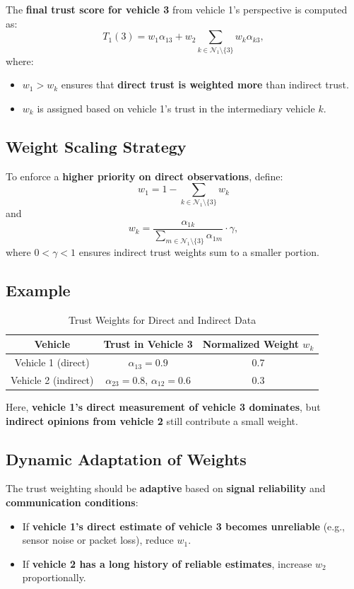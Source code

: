 \documentclass[letterpaper, 10pt, conference]{ieeeconf}  %
\begin{document}
The \textbf{final trust score for vehicle 3} from vehicle 1’s perspective is computed as:
\[
T_{1}(3) = w_1 \alpha_{13} + w_2 \sum_{k \in \mathcal{N}_1 \setminus \{3\}} w_k \alpha_{k3},
\]
where:
\begin{itemize}
    \item \( w_1 > w_k \) ensures that \textbf{direct trust is weighted more} than indirect trust.
    \item \( w_k \) is assigned based on vehicle 1’s trust in the intermediary vehicle \( k \).
\end{itemize}

\subsection{Weight Scaling Strategy}
To enforce a \textbf{higher priority on direct observations}, define:
\[
w_1 = 1 - \sum_{k \in \mathcal{N}_1 \setminus \{3\}} w_k
\]
and
\[
w_k = \frac{\alpha_{1k}}{\sum_{m \in \mathcal{N}_1 \setminus \{3\}} \alpha_{1m}} \cdot \gamma,
\]
where \( 0 < \gamma < 1 \) ensures indirect trust weights sum to a smaller portion.

\subsection{Example}
\begin{table}[h!]
\centering
\begin{tabular}{ccc}
\toprule
Vehicle & Trust in Vehicle 3 & Normalized Weight \( w_k \) \\
\midrule
Vehicle 1 (direct) & \( \alpha_{13} = 0.9 \) & 0.7 \\
Vehicle 2 (indirect) & \( \alpha_{23} = 0.8 \), \( \alpha_{12} = 0.6 \) & 0.3 \\
\bottomrule
\end{tabular}
\caption{Trust Weights for Direct and Indirect Data}
\end{table}

Here, \textbf{vehicle 1’s direct measurement of vehicle 3 dominates}, but \textbf{indirect opinions from vehicle 2} still contribute a small weight.



\subsection{Dynamic Adaptation of Weights}
The trust weighting should be \textbf{adaptive} based on \textbf{signal reliability} and \textbf{communication conditions}:
\begin{itemize}
    \item If \textbf{vehicle 1's direct estimate of vehicle 3 becomes unreliable} (e.g., sensor noise or packet loss), reduce \( w_1 \).
    \item If \textbf{vehicle 2 has a long history of reliable estimates}, increase \( w_2 \) proportionally.
\end{itemize}
\end{document}

